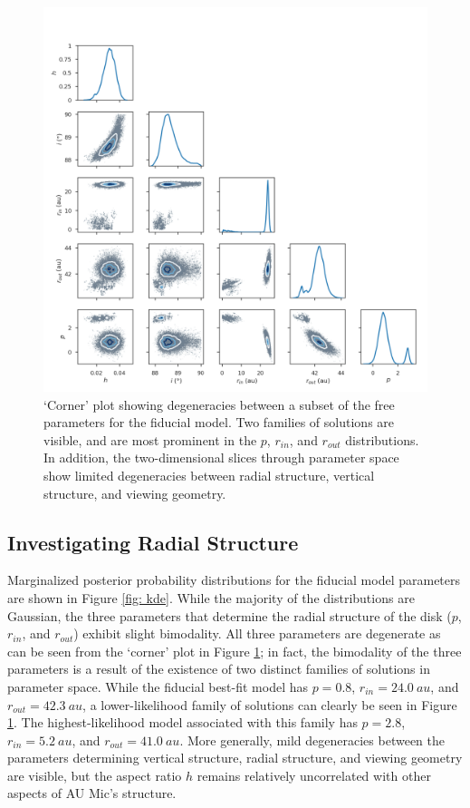 \documentclass[modern]{aastex62}
\begin{document}
\begin{figure}
  \centering
  \includegraphics[width=0.9\linewidth]{../figures/degeneracy_corner}
  \caption{`Corner' plot showing degeneracies between a subset of the free parameters for the fiducial model.
  Two families of solutions are visible, and are most prominent in the $p$, $r_{in}$, and $r_{out}$ distributions.
  In addition, the two-dimensional slices through parameter space show limited degeneracies between radial structure, vertical structure, and viewing geometry.}
  \label{fig: degeneracies}
\end{figure}

\subsection{Investigating Radial Structure}
\label{subsection: radial analysis}

Marginalized posterior probability distributions for the fiducial model parameters are shown in Figure \ref{fig: kde}.
While the majority of the distributions are Gaussian, the three parameters that determine the radial structure of the disk ($p$, $r_{in}$, and $r_{out}$) exhibit slight bimodality. 
All three parameters are degenerate as can be seen from the `corner' plot in Figure \ref{fig: degeneracies}; in fact, the bimodality of the three parameters is a result of the existence of two distinct families of solutions in parameter space.
While the fiducial best-fit model has $p=0.8$, $r_{in}=\SI{24.0}{au}$, and $r_{out}=\SI{42.3}{au}$, a lower-likelihood family of solutions can clearly be seen in Figure \ref{fig: degeneracies}. The highest-likelihood model associated with this family has $p = 2.8$, $r_{in} = \SI{5.2}{au}$, and $r_{out} = \SI{41.0}{au}$.
More generally, mild degeneracies between the parameters determining vertical structure, radial  structure, and viewing geometry are visible, but the aspect ratio $h$ remains relatively uncorrelated with other aspects of AU Mic's structure.
\end{document}
